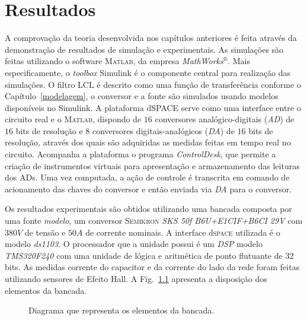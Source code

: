 
\chapter{Resultados}\label{resultados}

  A comprovação da teoria desenvolvida nos capítulos anteriores é feita através da demonstração de resultados de simulação e experimentais. As simulações são feitas utilizando o software \textsc{Matlab}, da empresa \textit{MathWorks}$^\circledR$. Mais especificamente, o \textit{toolbox} Simulink é o componente central para realização das simulações. O filtro LCL é descrito como uma função de transferência conforme o Capítulo~\ref{modelagem}, o conversor e a fonte são simulados usando modelos disponíveis no Simulink. A plataforma d\textsc{SPACE} serve como uma interface entre o circuito real e o \textsc{Matlab}, dispondo de $16$ conversores analógico-digitais (\emph{AD}) de $16$ bits de resolução e $8$ conversores digitais-analógicos (\emph{DA}) de $16$ bits de resolução, através dos quais são adquiridas as medidas feitas em tempo real no circuito. Acompanha a plataforma o programa \emph{ControlDesk}, que permite a criação de instrumentos virtuais para apresentação e armazenamento das leituras dos ADs. Uma vez computada, a ação de controle é transcrita em comando de acionamento das chaves do conversor e então enviada via \emph{DA} para o conversor.

  Os resultados experimentais são obtidos utilizando uma bancada composta por uma fonte \textit{modelo}, um conversor \textsc{Semikron} \textit{SKS 50f B6U+E1CIF+B6CI 29V} com $380V$ de tensão e $50A$ de corrente nominais. A interface d\textsc{space} utilizada é o modelo \textit{ds1103}. O processador que a unidade possui é um \emph{DSP} modelo \emph{TMS320F240} com uma unidade de lógica e aritmética de ponto flutuante de $32$ bits. As medidas corrente do capacitor e da corrente do lado da rede foram feitas utilizando sensores de Efeito Hall. A Fig.~\ref{fig:topologia_bancada} apresenta a disposição dos elementos da bancada.
  \begin{figure}[htb]
    \centering{
      \def\svgwidth{0.9\textwidth}
      }
    \renewcommand\figurename{Fig.}
    \caption{Diagrama que representa os elementos da bancada.}
    \label{fig:topologia_bancada}
  \end{figure}


